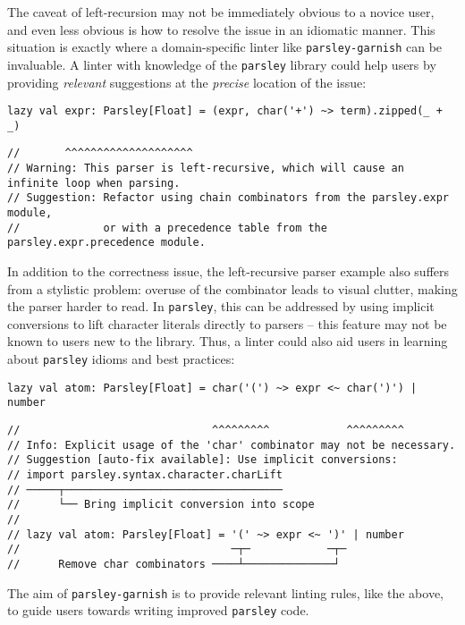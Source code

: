 \documentclass[../../main.tex]{subfiles}
\begin{document}
The caveat of left-recursion may not be immediately obvious to a novice user, and even less obvious is how to resolve the issue in an idiomatic manner.
This situation is exactly where a domain-specific linter like \texttt{parsley-garnish} can be invaluable.
A linter with knowledge of the \texttt{parsley} library could help users by providing \emph{relevant} suggestions at the \emph{precise} location of the issue:
\begin{verbatim}
lazy val expr: Parsley[Float] = (expr, char('+') ~> term).zipped(_ + _)
\end{verbatim}
\vspace{-4ex}
\begin{verbatim}
//       ^^^^^^^^^^^^^^^^^^^^
// Warning: This parser is left-recursive, which will cause an infinite loop when parsing.
// Suggestion: Refactor using chain combinators from the parsley.expr module,
//             or with a precedence table from the parsley.expr.precedence module.
\end{verbatim}
%
In addition to the correctness issue, the left-recursive parser example also suffers from a stylistic problem:
overuse of the \scala{char} combinator leads to visual clutter, making the parser harder to read.
In \texttt{parsley}, this can be addressed by using implicit conversions to lift character literals directly to parsers -- this feature may not be known to users new to the library.
Thus, a linter could also aid users in learning about \texttt{parsley} idioms and best practices:
\begin{verbatim}
lazy val atom: Parsley[Float] = char('(') ~> expr <~ char(')') | number
\end{verbatim}
\vspace{-4ex}
\begin{verbatim}
//                              ^^^^^^^^^            ^^^^^^^^^
// Info: Explicit usage of the 'char' combinator may not be necessary.
// Suggestion [auto-fix available]: Use implicit conversions:
// import parsley.syntax.character.charLift
// ─────┬──────────────────────────────────
//      └── Bring implicit conversion into scope
//
// lazy val atom: Parsley[Float] = '(' ~> expr <~ ')' | number
//                                 ─┬─            ─┬─
//      Remove char combinators ────┴──────────────┘
\end{verbatim}
%
The aim of \texttt{parsley-garnish} is to provide relevant linting rules, like the above, to guide users towards writing improved \texttt{parsley} code.
\end{document}
